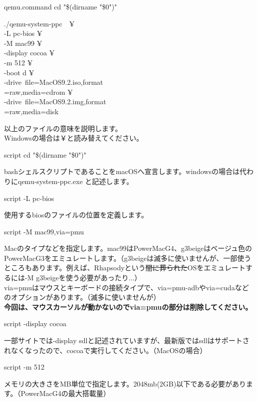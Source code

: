 \documentclass[b5paper,9pt,platex,dvipdfmx]{jsarticle}
\begin{document}
\begin{multicols*}{3}
\begin{itembox}{qemu.command}
cd "\$(dirname "\$0")"

./qemu-system-ppc　¥ \\
-L pc-bios ¥ \\
-M mac99 ¥ \\
-display cocoa ¥ \\
-m 512 ¥ \\
-boot d ¥ \\
-drive\ file=MacOS9.2.iso,format\\
=raw,media=cdrom ¥ \\
-drive\ file=MacOS9.2.img,format\\
=raw,media=disk \\
\end{itembox}
以上のファイルの意味を説明します。\\
Windowsの場合は￥と読み替えてください。\\
\begin{itembox}{script}
  cd "\$(dirname "\$0")"\\
\end{itembox}
bashシェルスクリプトであることをmacOSへ宣言します。windowsの場合は代わりにqemu-system-ppc.exe と記述します。\\
\begin{itembox}{script}
-L pc-bios
\end{itembox}
使用するbiosのファイルの位置を定義します。\\
\begin{itembox}{script}
-M mac99,via=pmu 
\end{itembox}
Macのタイプなどを指定します。mac99はPowerMacG4、g3beigeはベージュ色のPowerMacG3をエミュレートします。（g3beigeは滅多に使いませんが、一部使うところもあります。例えば、Rhapsodyという\sout{闇に葬られた}OSをエミュレートするには-M g3beigeを使う必要があったり...）\\
via=pmuはマウスとキーボードの接続タイプで、via=pmu-adbやvia=cudaなどのオプションがあります。（滅多に使いませんが）\\
\textbf{今回は、マウスカーソルが動かないのでvia=pmuの部分は削除してください。}\\
\begin{itembox}{script}
-display cocoa 
\end{itembox}
一部サイトでは-display sdlと記述されていますが、最新版ではsdlはサポートされなくなったので、cocoaで実行してください。（MacOSの場合）\\
\begin{itembox}{script}
-m 512 
\end{itembox}
メモリの大きさをMB単位で指定します。2048mb(2GB)以下である必要があります。（PowerMacG4の最大搭載量）\\

\end{multicols*}
\end{document}

